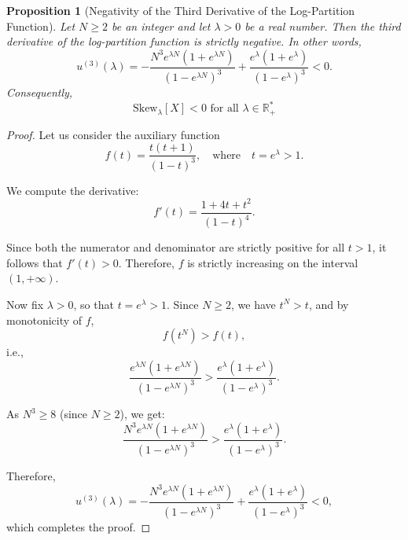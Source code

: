 \documentclass[a4paper, 10pt]{article}
\newtheorem{proposition}{Proposition}[section]
\theoremstyle{definition}
\begin{document}
\begin{proposition}[Negativity of the Third Derivative of the Log-Partition Function]\label{prop:neg_third_deriv}
Let \( N \geq 2 \) be an integer and let \( \lambda > 0 \) be a real number. Then the third derivative of the log-partition function is strictly negative. In other words,
\[
u^{(3)}(\lambda) = -\frac{N^3 e^{\lambda N}(1 + e^{\lambda N})}{(1 - e^{\lambda N})^3} + \frac{e^{\lambda}(1 + e^{\lambda})}{(1 - e^{\lambda})^3} < 0.
\]
Consequently,
\[
\text{Skew}_{\lambda}[X] < 0 \text{ for all } \lambda \in \mathbb{R}_+^*
\]
\end{proposition}
\begin{proof}
Let us consider the auxiliary function
\[
f(t) = \frac{t(t + 1)}{(1 - t)^3}, \quad \text{where} \quad t = e^{\lambda} > 1.
\]

We compute the derivative:
\[
f'(t) = \frac{1 + 4t + t^2}{(1 - t)^4}.
\]

Since both the numerator and denominator are strictly positive for all \( t > 1 \), it follows that \( f'(t) > 0 \). Therefore, \( f \) is strictly increasing on the interval \( (1, +\infty) \).

Now fix \( \lambda > 0 \), so that \( t = e^{\lambda} > 1 \). Since \( N \geq 2 \), we have \( t^N > t \), and by monotonicity of \( f \),
\[
f(t^N) > f(t),
\]
i.e.,
\[
\frac{e^{\lambda N}(1 + e^{\lambda N})}{(1 - e^{\lambda N})^3} > \frac{e^{\lambda}(1 + e^{\lambda})}{(1 - e^{\lambda})^3}.
\]

As \( N^3 \geq 8 \) (since \( N \geq 2 \)), we get:
\[
\frac{N^3 e^{\lambda N}(1 + e^{\lambda N})}{(1 - e^{\lambda N})^3} > \frac{e^{\lambda}(1 + e^{\lambda})}{(1 - e^{\lambda})^3}.
\]

Therefore,
\[
u^{(3)}(\lambda) 
= - \frac{N^3 e^{\lambda N}(1 + e^{\lambda N})}{(1 - e^{\lambda N})^3}
+ \frac{e^{\lambda}(1 + e^{\lambda})}{(1 - e^{\lambda})^3}
< 0,
\]
which completes the proof.
\end{proof}



\end{document}
